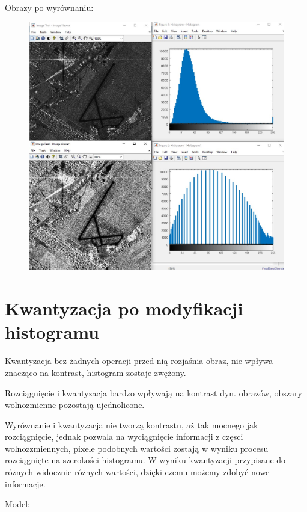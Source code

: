 \documentclass{article}
\begin{document}
\newpage

Obrazy po wyrównaniu:

\begin{figure}[h!]
    \centering
    \includegraphics[scale=0.5]{zad1_porownanie1.jpg}
\end{figure}

\newpage

\section{Kwantyzacja po modyfikacji histogramu}

Kwantyzacja bez żadnych operacji przed nią rozjaśnia obraz, nie wpływa znacząco na kontrast, histogram zostaje zwężony.

Rozciągnięcie i kwantyzacja bardzo wpływają na kontrast dyn. obrazów, obszary wolnozmienne pozostają ujednolicone.

Wyrównanie i kwantyzacja nie tworzą kontrastu, aż tak mocnego jak rozciągnięcie, jednak pozwala na wyciągnięcie informacji z częsci wolnozzmiennych, pixele podobnych wartości zostają w wyniku procesu rozciągnięte na szerokości histogramu. W wyniku kwantyzacji przypisane do różnych widocznie różnych
wartości, dzięki czemu możemy zdobyć nowe informacje.



Model:
\end{document}
